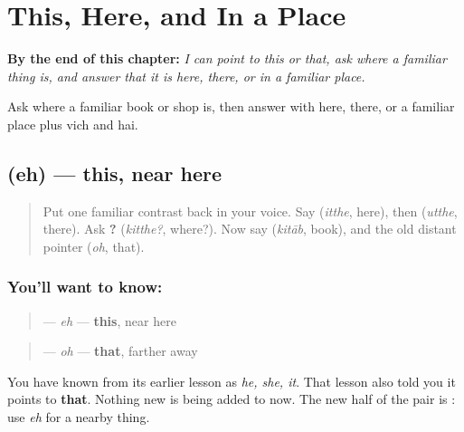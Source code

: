 
\chapter{This, Here, and In a Place}
\label{ch:pa-pointing-place-a1}

\begin{chapteropening}
\textbf{By the end of this chapter:} \emph{I can point to this or that, ask where a familiar thing is, and answer that it is here, there, or in a familiar place.}

Ask where a familiar book or shop is, then answer with here, there, or a familiar place plus vich and hai.
\end{chapteropening}

\section[\texorpdfstring{\pa{ਇਹ} (eh)}{ਇਹ (eh)}]{ (eh) — this, near here}

\label{lesson:PA-C176-eh}



\begin{quote}
Put one familiar contrast back in your voice. Say \textbf{} (\emph{itthe}, here), then \textbf{} (\emph{utthe}, there). Ask \textbf{?} (\emph{kitthe?}, where?). Now say \textbf{} (\emph{kitāb}, book), and the old distant pointer \textbf{} (\emph{oh}, that).
\end{quote}

\subsection*{You'll want to know: }
\begin{quote}
\textbf{} — \emph{eh} — \textbf{this}, near here
\end{quote}

\begin{quote}
\textbf{} — \emph{oh} — \textbf{that}, farther away
\end{quote}

You have known \textbf{} from its earlier lesson as \emph{he, she, it}. That lesson also told you it points to \textbf{that}. Nothing new is being added to \textbf{} now. The new half of the pair is \textbf{}: use \emph{eh} for a nearby thing.

